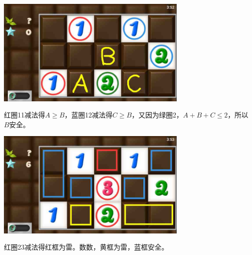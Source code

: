 \subsection{} %
\begin{center}
    \includegraphics[width=0.7\textwidth]{puzzlelow/92-1.jpg}
\end{center}
红圈11减法得$A\ge B$，蓝圈12减法得$C\ge B$，又因为绿圈2，$A+B+C\le 2$，所以$B$安全。
\begin{center}
    \includegraphics[width=0.7\textwidth]{puzzlelow/92-2.jpg}
\end{center}
红圈23减法得红框为雷。数数，黄框为雷，蓝框安全。

